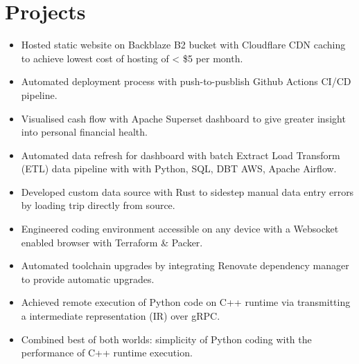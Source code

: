 \section{Projects}
\begin{itemize}
  \item Hosted static website on Backblaze B2 bucket with Cloudflare CDN caching to achieve lowest cost of hosting of < \$5 per month.
  \item Automated deployment process with push-to-pusblish Github Actions CI/CD pipeline.
\end{itemize}

\begin{itemize}
  \item Visualised cash flow with Apache Superset dashboard to give greater insight into personal financial health.
  \item Automated data refresh for dashboard with batch Extract Load Transform (ETL) data pipeline with with Python, SQL, DBT AWS, Apache Airflow.
  \item Developed custom data source with Rust to sidestep manual data entry errors by loading trip directly from source.
\end{itemize}
\begin{itemize}
  \item Engineered coding environment accessible on any device with a Websocket enabled browser with Terraform \& Packer.
  \item Automated toolchain upgrades by integrating Renovate dependency manager to provide automatic upgrades.
\end{itemize}
\begin{itemize}
  \item Achieved remote execution of Python code on C++ runtime via transmitting a intermediate representation (IR) over gRPC.
  \item Combined best of both worlds: simplicity of Python coding with the performance of C++ runtime execution.
\end{itemize}

